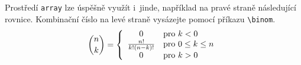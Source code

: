 \documentclass[hidelinks ,twoside, 11pt ,twocolumn, a4paper]{article}
\begin{document}
Prostředí \verb|array| lze úspěšně využít i~jinde, například na
pravé straně následující rovnice. Kombinační číslo na levé
straně vysázejte pomocí příkazu \verb|\binom|.
\[
\binom{n}{k} = \left\{
\begin{array}{c l}
0 & \text{pro } k < 0 \\
\frac{n!}{k!(n-k)!} & \text{pro } 0 \le k \le n\\
0 & \text{pro } k > 0 \\
\end{array} \right.
\]
\end{document}
